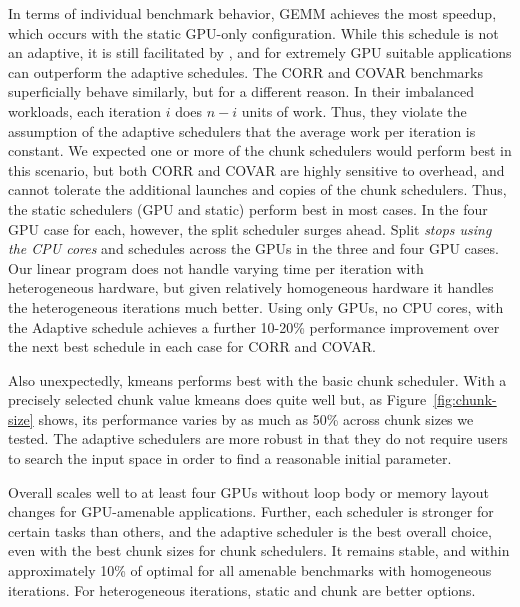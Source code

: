 In terms of individual benchmark behavior, GEMM achieves the most speedup,
which occurs with the static GPU-only configuration. While this schedule is
not an adaptive, it is still facilitated by \tsar, and for extremely GPU
suitable applications can outperform the adaptive schedules. The CORR and
COVAR benchmarks superficially behave similarly, but for a different reason.
In their imbalanced workloads, each iteration $i$ does $n - i$ units of work.
Thus, they violate the assumption of the adaptive schedulers that the average
work per iteration is constant. We expected one or more of the chunk
schedulers would perform best in this scenario, but both CORR and COVAR are
highly sensitive to overhead, and cannot tolerate the additional launches and
copies of the chunk schedulers. Thus, the static schedulers (GPU and static)
perform best in most cases. In the four GPU case for each, however, the split
scheduler surges ahead.  Split \emph{stops using the CPU cores} and schedules
across the GPUs in the three and four GPU cases. Our linear program does not
handle varying time per iteration with heterogeneous hardware, but given
relatively homogeneous hardware it handles the heterogeneous iterations much
better.
Using only GPUs, no CPU cores, with the Adaptive schedule achieves a further
10-20\% performance improvement over the next best schedule in each case for
CORR and COVAR.



Also unexpectedly, kmeans performs best with the basic chunk scheduler. With a
precisely selected chunk value kmeans does quite well but, as
Figure~\ref{fig:chunk-size} shows, its performance varies by as much as 50\%
across chunk sizes we tested.  The adaptive schedulers are more robust in that
they do not require users to search the input space in order to find a
reasonable initial parameter.

Overall \tsar scales well to at least four GPUs without loop body or memory
layout changes for GPU-amenable applications. Further, each scheduler is
stronger for certain tasks than others, and the adaptive scheduler is the
best overall choice, even with the best chunk sizes for chunk schedulers.
It remains stable, and within approximately 10\% of optimal for all amenable
benchmarks with homogeneous iterations. For heterogeneous iterations, static
and chunk are better options.

